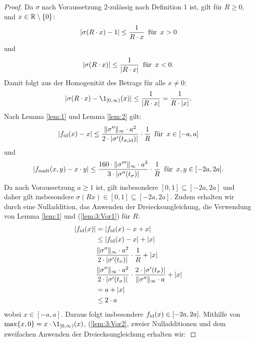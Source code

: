   \begin{proof}
  Da $\sigma$ nach Voraussetzung 2-zulässig nach Definition 1 ist, gilt für $R \geq 0,$ und $x \in \mathbb{R}\setminus\{0\}\colon$ $$|\sigma(R \cdot x) - 1| \leq \frac{1}{R\cdot x} \text{\, für \,} x > 0$$ und $$|\sigma(R \cdot x)| \leq \frac{1}{|R \cdot x|} \text{\, für \,} x < 0.$$
Damit folgt aus der Homogenität des Betrags für alle $x \neq 0$: 
\begin{equation}
\label{lem:3:Bed1} 
|\sigma(R \cdot x) - \1_{[0, \infty)}(x)| \leq \frac{1}{|R \cdot x|} = \frac{1}{R \cdot |x|}.
\end{equation} 
Nach Lemma \ref{lem:1} und Lemma \ref{lem:2} gilt:
\begin{equation}
\label{lem:3:Bed2} 
|f_{\mathrm{id}}(x) - x| \leq \frac{\|\sigma''\|_{\infty} \cdot a^2}{2 \cdot |\sigma'(t_{\sigma, \mathrm{id}})|} \cdot \frac{1}{R} \text{\, für \,} x \in [-a, a]
\end{equation}
 und 
\begin{equation}
\label{lem:3:Bed3}
 |f_{\mathrm{mult}}(x, y) - x \cdot y| \leq \frac{160 \cdot \|\sigma'''\|_{\infty} \cdot a ^3}{3 \cdot |\sigma''(t_{\sigma})|} \cdot \frac{1}{R} \text{\, für \,} x, y \in [-2a, 2a].
 \end{equation} 
Da nach Voraussetzung $a \geq 1$ ist, gilt insbesondere $[0, 1] \subseteq [-2a, 2a]$ und daher gilt insbesondere $\sigma(Rx) \in [0, 1]\subseteq [-2a, 2a].$ 
Zudem erhalten wir durch eine Nulladdition, das Anwenden der Dreiecksungleichung, die Verwendung von Lemma \ref{lem:1} und (\ref{lem:3:Vor1}) für $R$:
\begin{equation*}
\begin{split}
|f_{\mathrm{id}}(x)| & = |f_{\mathrm{id}}(x) - x + x| \\
& \leq |f_{\mathrm{id}}(x) -x| + |x| \\
&  \frac{\|\sigma''\|_{\infty} \cdot a^2}{2 \cdot |\sigma'(t_{\sigma})|} \cdot \frac{1}{R} + |x| \\
& \frac{\|\sigma''\|_{\infty} \cdot a^2}{2 \cdot |\sigma'(t_{\sigma})|} \cdot \frac{2 \cdot |\sigma'(t_{\sigma})|}{\|\sigma''\|_{\infty} \cdot a} + |x| \\
& = a + |x| \\
& \leq 2 \cdot a
\end{split}
\end{equation*}
wobei $x \in [-a, a]$. Daraus folgt insbesondere $f_{\mathrm{id}}(x) \in [-2a, 2a].$
Mithilfe von $\max\{x, 0 \} = x \cdot \1_{[0, \infty)}(x)$, (\ref{lem:3:Vor2}, zweier Nulladditionen und dem zweifachen Anwenden der Dreiecksungleichung erhalten wir$\colon$

\end{proof}
